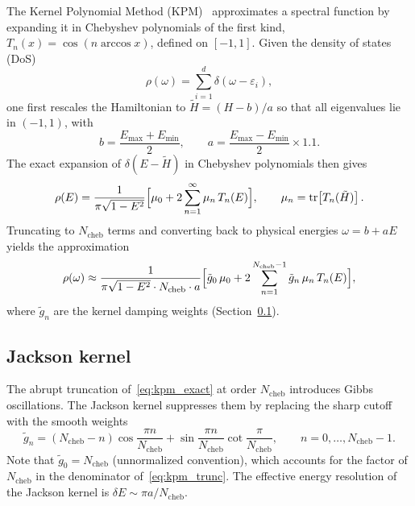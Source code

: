 \documentclass[11pt,a4paper]{article}
\begin{document}
The Kernel Polynomial Method (KPM)~\cite{Weisse2006} approximates a spectral
function by expanding it in Chebyshev polynomials of the first kind,
$T_n(x) = \cos(n\arccos x)$, defined on $[-1,1]$.  Given the density of
states (DoS)
\begin{equation}
  \rho(\omega) = \sum_{i=1}^{d} \delta(\omega - \varepsilon_i),
\end{equation}
one first rescales the Hamiltonian to $\tilde H = (H - b)/a$ so that all
eigenvalues lie in $(-1,1)$, with
\begin{equation}
  b = \frac{E_{\max}+E_{\min}}{2}, \qquad
  a = \frac{E_{\max}-E_{\min}}{2}\times 1.1.
\end{equation}
The exact expansion of $\delta(E-\tilde H)$ in Chebyshev polynomials then
gives
\begin{equation}
  \rho(E) = \frac{1}{\pi\sqrt{1-E^2}}
  \Bigl[\mu_0 + 2\sum_{n=1}^{\infty} \mu_n\, T_n(E)\Bigr],
  \qquad \mu_n = \mathrm{tr}\!\left[T_n(\tilde H)\right].
  \label{eq:kpm_exact}
\end{equation}
Truncating to $N_{\mathrm{cheb}}$ terms and converting back to physical
energies $\omega = b + aE$ yields the approximation
\begin{equation}
  \rho(\omega) \approx
  \frac{1}{\pi\sqrt{1-E^2}\cdot N_{\mathrm{cheb}}\cdot a}
  \Bigl[\tilde g_0\,\mu_0 + 2\sum_{n=1}^{N_{\mathrm{cheb}}-1} \tilde g_n\,\mu_n\,T_n(E)\Bigr],
  \label{eq:kpm_trunc}
\end{equation}
where $\tilde g_n$ are the kernel damping weights (Section~\ref{sec:jackson}).

\subsection{Jackson kernel}
\label{sec:jackson}

The abrupt truncation of~\eqref{eq:kpm_exact} at order $N_{\mathrm{cheb}}$
introduces Gibbs oscillations.  The Jackson kernel suppresses them by
replacing the sharp cutoff with the smooth weights
\begin{equation}
  \tilde g_n = (N_{\mathrm{cheb}}-n)\cos\!\frac{\pi n}{N_{\mathrm{cheb}}}
              + \sin\!\frac{\pi n}{N_{\mathrm{cheb}}}\cot\!\frac{\pi}{N_{\mathrm{cheb}}},
  \qquad n = 0,\ldots,N_{\mathrm{cheb}}-1.
  \label{eq:jackson}
\end{equation}
Note that $\tilde g_0 = N_{\mathrm{cheb}}$ (unnormalized convention), which
accounts for the factor of $N_{\mathrm{cheb}}$ in the denominator
of~\eqref{eq:kpm_trunc}.  The effective energy resolution of the Jackson
kernel is $\delta E \sim \pi a / N_{\mathrm{cheb}}$.
\end{document}
